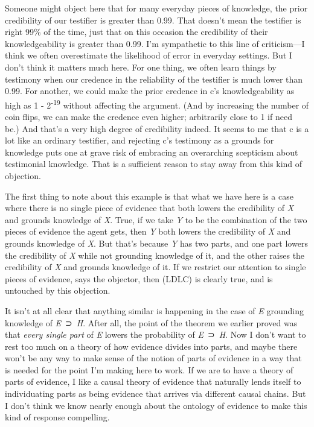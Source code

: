 \documentclass[
  11pt,
  letterpaper,
  DIV=11,
  numbers=noendperiod,
  twoside]{scrartcl}
\begin{document}
Someone might object here that for many everyday pieces of knowledge,
the prior credibility of our testifier is greater than 0.99. That
doesn't mean the testifier is right 99\% of the time, just that on this
occasion the credibility of their knowledgeability is greater than 0.99.
I'm sympathetic to this line of criticism---I think we often
overestimate the likelihood of error in everyday settings. But I don't
think it matters much here. For one thing, we often learn things by
testimony when our credence in the reliability of the testifier is much
lower than 0.99. For another, we could make the prior credence in c's
knowledgeability as high as 1 - 2\textsuperscript{-19} without affecting
the argument. (And by increasing the number of coin flips, we can make
the credence even higher; arbitrarily close to 1 if need be.) And that's
a very high degree of credibility indeed. It seems to me that c is a lot
like an ordinary testifier, and rejecting c's testimony as a grounds for
knowledge puts one at grave risk of embracing an overarching scepticism
about testimonial knowledge. That is a sufficient reason to stay away
from this kind of objection.

The first thing to note about this example is that what we have here is
a case where there is no single piece of evidence that both lowers the
credibility of \emph{X} and grounds knowledge of \emph{X}. True, if we
take \emph{Y} to be the combination of the two pieces of evidence the
agent gets, then \emph{Y} both lowers the credibility of \emph{X} and
grounds knowledge of \emph{X}. But that's because \emph{Y} has two
parts, and one part lowers the credibility of \emph{X} while not
grounding knowledge of it, and the other raises the credibility of
\emph{X} and grounds knowledge of it. If we restrict our attention to
single pieces of evidence, says the objector, then (LDLC) is clearly
true, and is untouched by this objection.

It isn't at all clear that anything similar is happening in the case of
\emph{E} grounding knowledge of \emph{E}~⊃~\emph{H}. After all, the
point of the theorem we earlier proved was that \emph{every single part}
of \emph{E} lowers the probability of \emph{E}~⊃~\emph{H}. Now I don't
want to rest too much on a theory of how evidence divides into parts,
and maybe there won't be any way to make sense of the notion of parts of
evidence in a way that is needed for the point I'm making here to work.
If we are to have a theory of parts of evidence, I like a causal theory
of evidence that naturally lends itself to individuating parts as being
evidence that arrives via different causal chains. But I don't think we
know nearly enough about the ontology of evidence to make this kind of
response compelling.
\end{document}
